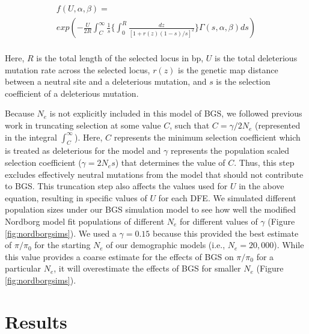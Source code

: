 \documentclass[9pt,twocolumn,twoside]{rilabRxiv}
\begin{document}
\begin{equation*}
    \begin{align}
        f(U,\alpha,\beta)=\\
    exp\left( -\frac{U}{2R}\int^{\infty}_C\frac{1}{s}\bigg\{\int_0^R\frac{dz}{[1+r(z)(1-s)/s]^2}\bigg\}\Gamma(s,\alpha,\beta)ds \right)\\
    \end{align}
\end{equation*}
    

Here, $R$ is the total length of the selected locus in bp, $U$ is the total deleterious mutation rate across the selected locus, $r(z)$ is the genetic map distance between a neutral site and a deleterious mutation, and $s$ is the selection coefficient of a deleterious mutation.

Because $N_e$ is not explicitly included in this model of BGS, we followed previous work \citep{charlesworth2012role, comeron2014background} in truncating selection at some value $C$,
such that $C = \gamma/2N_e$ (represented in the integral $\int^{\infty}_C$).
Here, $C$ represents the minimum selection coefficient which is treated as deleterious for the model and $\gamma$ represents the population scaled selection coefficient ($\gamma = 2N_es$) that determines the value of $C$.
Thus, this step excludes effectively neutral mutations from the model that should not contribute to BGS.
This truncation step also affects the values used for $U$ in the above equation, resulting in specific values of $U$ for each DFE.
We simulated different population sizes under our BGS simulation model to see how well the modified Nordborg model fit populations of different $N_e$ for different values of $\gamma$ (Figure \ref{fig:nordborgsims}).
We used a $\gamma = 0.15$ because this provided the best estimate of $\pi/\pi_0$ for the starting $N_e$ of our demographic models (i.e., $N_e = 20,000$).
While this value provides a coarse estimate for the effects of BGS on $\pi/\pi_0$ for a particular $N_e$, it will overestimate the effects of BGS for smaller $N_e$ (Figure \ref{fig:nordborgsims}).

\section{Results}
\end{document}
